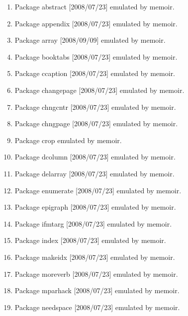 			\begin{enumerate}
			\item 	Package abstract [2008/07/23] emulated by memoir.
			\item 	Package appendix [2008/07/23] emulated by memoir.
			\item 	Package array [2008/09/09] emulated by memoir.
			\item 	Package booktabs [2008/07/23] emulated by memoir.
			\item 	Package ccaption [2008/07/23] emulated by memoir.
			\item 	Package changepage [2008/07/23] emulated by memoir.
			\item 	Package chngcntr [2008/07/23] emulated by memoir.
			\item 	Package chngpage [2008/07/23] emulated by memoir.
			\item 	Package crop emulated by memoir.
			\item 	Package dcolumn [2008/07/23] emulated by memoir.
			\item 	Package delarray [2008/07/23] emulated by memoir.
			\item 	Package enumerate [2008/07/23] emulated by memoir.
			\item 	Package epigraph [2008/07/23] emulated by memoir.
			\item 	Package ifmtarg [2008/07/23] emulated by memoir.
			\item 	Package index [2008/07/23] emulated by memoir.
			\item 	Package makeidx [2008/07/23] emulated by memoir.
			\item 	Package moreverb [2008/07/23] emulated by memoir.
			\item 	Package mparhack [2008/07/23] emulated by memoir.
			\item 	Package needspace [2008/07/23] emulated by memoir.

\end{enumerate}

